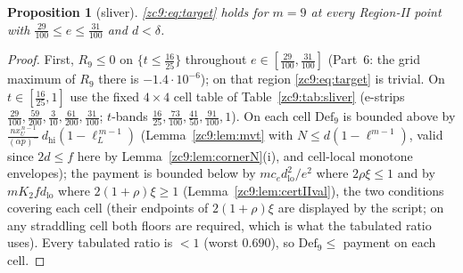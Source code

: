 \documentclass[11pt]{amsart}
\newtheorem{proposition}[theorem]{Proposition}
\newcommand{\Def}{\mathrm{Def}}
\begin{document}
\begin{proposition}[sliver]\label{zc9:prop:sliver}
\eqref{zc9:eq:target} holds for $m=9$ at every Region-II point with
$\tfrac{29}{100}\le e\le\tfrac{31}{100}$ and $d<\delta$.
\end{proposition}

\begin{proof}
First, $R_9\le0$ on $\{t\le\tfrac{16}{25}\}$ throughout
$e\in[\tfrac{29}{100},\tfrac{31}{100}]$ (Part~6: the grid maximum of $R_9$ there
is $-1.4\cdot10^{-6}$); on that region \eqref{zc9:eq:target} is trivial.  On
$t\in[\tfrac{16}{25},1]$ use the fixed $4\times4$ cell table of
Table~\ref{zc9:tab:sliver} (e-strips
$\tfrac{29}{100},\tfrac{59}{200},\tfrac3{10},\tfrac{61}{200},\tfrac{31}{100}$;
$t$-bands $\tfrac{16}{25},\tfrac{73}{100},\tfrac{41}{50},\tfrac{91}{100},1$).
On each cell $\Def_9$ is bounded above by
$\tfrac{n x_U^{\,n-1}}{(\alpha p)^-}\,d_{\mathrm{hi}}(1-\ell_L^{\,m-1})$
(Lemma~\ref{zc9:lem:mvt} with $N\le d(1-\ell^{m-1})$, valid since $2d\le f$ here
by Lemma~\ref{zc9:lem:cornerN}(i), and cell-local monotone envelopes); the
payment is bounded below by $mc_e d_{\mathrm{lo}}^2/e^2$ where $2\rho\xi\le1$ and
by $mK_2fd_{\mathrm{lo}}$ where $2(1+\rho)\xi\ge1$
(Lemma~\ref{zc9:lem:certIIval}), the two conditions covering each cell (their
endpoints of $2(1+\rho)\xi$ are displayed by the script; on any straddling cell
both floors are required, which is what the tabulated ratio uses).  Every
tabulated ratio is $<1$ (worst $0.690$), so $\Def_9\le$ payment on each cell.
\end{proof}
\end{document}
